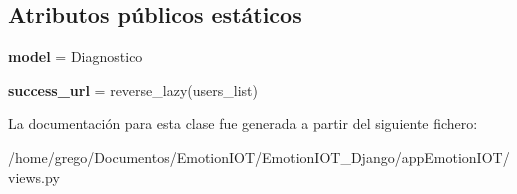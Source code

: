 \subsection*{Atributos públicos estáticos}
\begin{DoxyCompactItemize}
\item 
{\bfseries model} = Diagnostico\hypertarget{classappEmotionIOT_1_1views_1_1Delete__diagnostic_a1a95f0281690a0c5a1352b4eb5876547}{}\label{classappEmotionIOT_1_1views_1_1Delete__diagnostic_a1a95f0281690a0c5a1352b4eb5876547}

\item 
{\bfseries success\+\_\+url} = reverse\+\_\+lazy(\textquotesingle{}users\+\_\+list\textquotesingle{})\hypertarget{classappEmotionIOT_1_1views_1_1Delete__diagnostic_a18460af5a526958828ba1f01d8fb3409}{}\label{classappEmotionIOT_1_1views_1_1Delete__diagnostic_a18460af5a526958828ba1f01d8fb3409}

\end{DoxyCompactItemize}


La documentación para esta clase fue generada a partir del siguiente fichero\+:\begin{DoxyCompactItemize}
\item 
/home/grego/\+Documentos/\+Emotion\+I\+O\+T/\+Emotion\+I\+O\+T\+\_\+\+Django/app\+Emotion\+I\+O\+T/views.\+py\end{DoxyCompactItemize}
